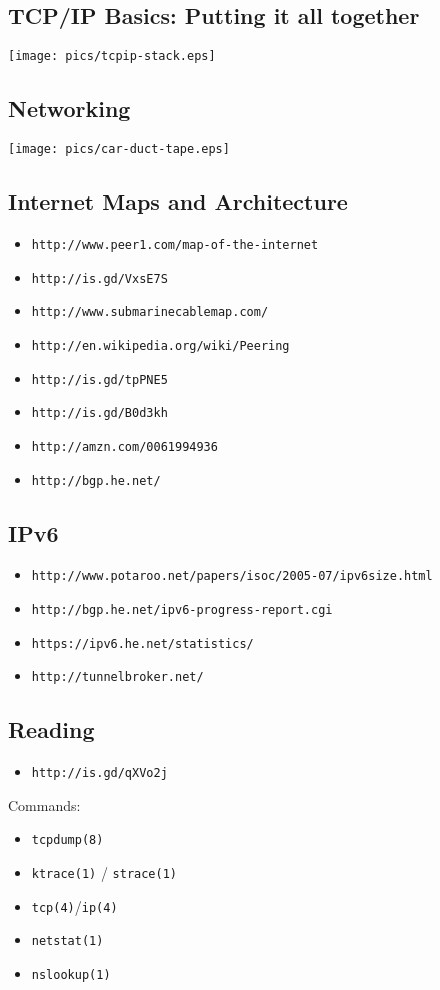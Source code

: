 \documentclass[xga]{xdvislides}
\begin{document}
\subsection{TCP/IP Basics: Putting it all together}
\vspace*{\fill}
\begin{center}
	\texttt{[image: pics/tcpip-stack.eps]}
\end{center}
\vspace*{\fill}

\subsection{Networking}
\vspace*{\fill}
\begin{center}
	\texttt{[image: pics/car-duct-tape.eps]} \\
\end{center}
\vspace*{\fill}


\subsection{Internet Maps and Architecture}
\begin{itemize}
	\item \verb+http://www.peer1.com/map-of-the-internet+
	\item \verb+http://is.gd/VxsE7S+
	\item \verb+http://www.submarinecablemap.com/+
	\item \verb+http://en.wikipedia.org/wiki/Peering+
	\item \verb+http://is.gd/tpPNE5+
	\item \verb+http://is.gd/B0d3kh+
	\item \verb+http://amzn.com/0061994936+
	\item \verb+http://bgp.he.net/+
\end{itemize}

\subsection{IPv6}
\begin{itemize}
	\item \verb+http://www.potaroo.net/papers/isoc/2005-07/ipv6size.html+
	\item \verb+http://bgp.he.net/ipv6-progress-report.cgi+
	\item \verb+https://ipv6.he.net/statistics/+
	\item \verb+http://tunnelbroker.net/+
\end{itemize}

\subsection{Reading}
\begin{itemize}
	\item \verb+http://is.gd/qXVo2j+
\end{itemize}
\vspace{.5in}
Commands:
\begin{itemize}
	\item \verb+tcpdump(8)+
	\item \verb+ktrace(1)+ / \verb+strace(1)+
	\item \verb+tcp(4)+/\verb+ip(4)+
	\item \verb+netstat(1)+
	\item \verb+nslookup(1)+
\end{itemize}
\end{document}
